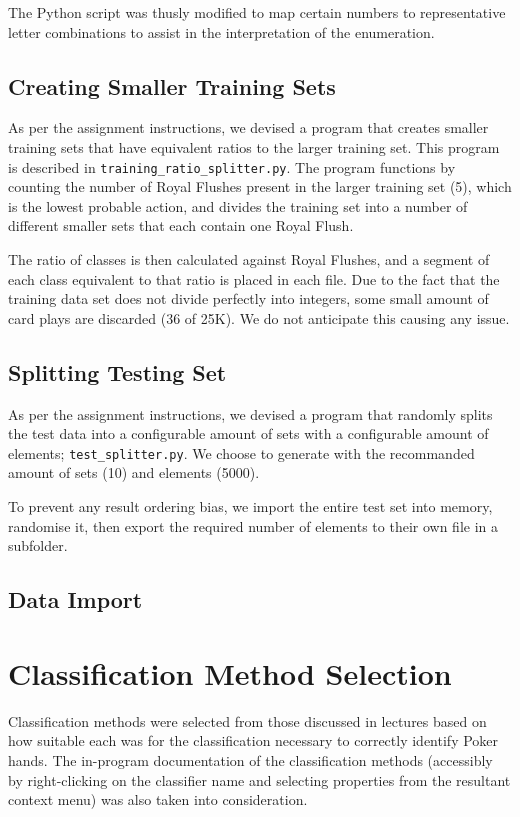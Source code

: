 \documentclass[11pt, a4paper]{article}
\begin{document}
The Python script was thusly modified to map certain numbers to representative letter combinations to assist in the interpretation of the enumeration.

\subsection*{Creating Smaller Training Sets}

As per the assignment instructions, we devised a program that creates smaller training sets that have equivalent ratios to the larger training set. This program is described in \texttt{training\_ratio\_splitter.py}. The program functions by counting the number of Royal Flushes present in the larger training set (5), which is the lowest probable action, and divides the training set into a number of different smaller sets that each contain one Royal Flush.

The ratio of classes is then calculated against Royal Flushes, and a segment of each class equivalent to that ratio is placed in each file. Due to the fact that the training data set does not divide perfectly into integers, some small amount of card plays are discarded (36 of 25K). We do not anticipate this causing any issue.

\subsection*{Splitting Testing Set}

As per the assignment instructions, we devised a program that randomly splits the test data into a configurable amount of sets with a configurable amount of elements; \texttt{test\_splitter.py}. We choose to generate with the recommanded amount of sets (10) and elements (5000).

To prevent any result ordering bias, we import the entire test set into memory, randomise it, then export the required number of elements to their own file in a subfolder.

\subsection*{Data Import}

\section*{Classification Method Selection}

Classification methods were selected from those discussed in lectures based on how suitable each was for the classification necessary to correctly identify Poker hands. The in-program documentation of the classification methods (accessibly by right-clicking on the classifier name and selecting properties from the resultant context menu) was also taken into consideration. 
\end{document}
